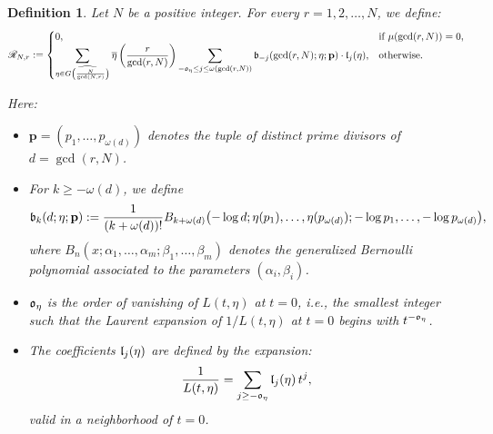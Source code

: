 \documentclass[12pt]{amsart}
\newtheorem{definition}[theorem]{Definition}%
\begin{document}
\begin{definition}\label{def:RNR} Let $N$ be a positive integer.
For every $r = 1, 2, \ldots, N$, we define:
\[
\mathscr{R}_{N,r} := 
\begin{cases}
0, & \text{if } \mu(\gcd(r,N)) = 0, \\
\displaystyle
\sum_{\eta \in \widehat{G\left( \frac{N}{\gcd(N,r)} \right)}} 
\overline{\eta}\left( \frac{r}{\gcd(r,N)} \right) 
\sum_{-\frak{o}_\eta \leq j \leq \omega(\gcd(r,N))} 
\frak{b}_{-j}(\gcd(r,N); \eta; \mathbf{p}) \cdot \frak{l}_j(\eta), & \text{otherwise}.
\end{cases}
\]


Here:


\begin{itemize}
    \item $\mathbf{p} = (p_1, \dots, p_{\omega(d)})$ denotes the tuple of distinct prime divisors of $d = \gcd(r,N)$.
    
    \item For $k \geq -\omega(d)$, we define
    \[
    \frak{b}_k(d; \eta; \mathbf{p}) := 
    \frac{1}{(k + \omega(d))!} 
    B_{k+\omega(d)}\bigl(-\log d; \eta(p_1), \dots, \eta(p_{\omega(d)}); -\log p_1, \dots, -\log p_{\omega(d)}\bigr),
    \]
    where $B_n(x; \alpha_1,\dots,\alpha_m; \beta_1,\dots,\beta_m)$ denotes the generalized Bernoulli polynomial associated to the parameters $(\alpha_i, \beta_i)$.


    \item $\frak{o}_\eta$ is the order of vanishing of $L(t, \eta)$ at $t=0$, i.e., the smallest integer such that the Laurent expansion of $1/L(t,\eta)$ at $t=0$ begins with $t^{-\frak{o}_\eta}$.


    \item The coefficients $\frak{l}_j(\eta)$ are defined by the expansion:
    \[
    \frac{1}{L(t, \eta)} = \sum_{j \geq -\frak{o}_\eta} \frak{l}_j(\eta) \, t^j,
    \]
    valid in a neighborhood of $t=0$.
\end{itemize}
\end{definition}
 
 
\end{document}
